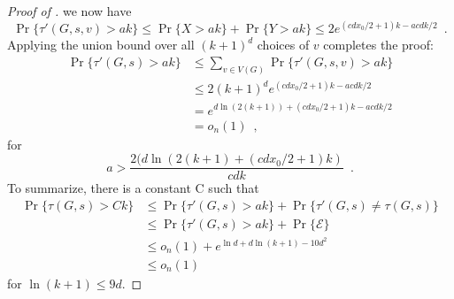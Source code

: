 \documentclass{patmorin}
\begin{document}
\begin{proof}[Proof of ]
 we now have
\[
   \Pr\{ \tau'(G,s,v) > ak\} \le \Pr\{X > ak\} + \Pr\{Y>ak\}
          \le 2 e^{(cdx_0/2+1)k - acdk/2} \enspace .
\]
Applying the union bound over all $(k+1)^d$ choices of $v$ completes the proof:
\begin{align*}
   \Pr\{\tau'(G,s) > ak\} 
     & \le \sum_{v\in V(G)} \Pr\{\tau'(G,s,v) > ak\}  \\
     & \le 2(k+1)^d e^{(cdx_0/2+1)k - acdk/2} \\
     & = e^{d\ln(2(k+1))+(cdx_0/2+1)k - acdk/2} \\
     & = o_n(1) \enspace ,
\end{align*}
for
\[
   a > \frac{2(d\ln(2(k+1)+(cdx_0/2+1)k)}{cdk} \enspace .
\]
To summarize, there is a constant C such that 
\begin{align*}
   \Pr\{\tau(G,s) > Ck\} 
     & \le \Pr\{\tau'(G,s) > ak\} + \Pr\{\tau'(G,s)\neq \tau(G,s)\} \\
     & \le \Pr\{\tau'(G,s) > ak\} + \Pr\{\mathcal{E}\} \\
     & \le o_n(1) + e^{\ln d + d\ln(k+1) - 10d^2} \\
     & \le o_n(1)
\end{align*}
for $\ln(k+1) \le 9d$.
\end{proof}

\end{document}

